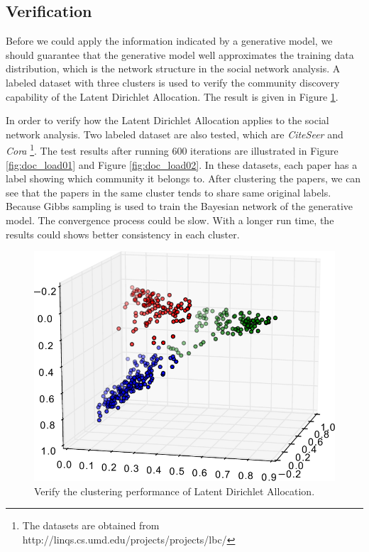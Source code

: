 \documentclass[letterpaper]{article}
\begin{document}
\subsection{Verification}

Before we could apply the information indicated by a generative model, we should guarantee that the generative model well approximates the training data distribution, which is the network structure in the social network analysis.
A labeled dataset with three clusters is used to verify the community discovery capability of the Latent Dirichlet Allocation.
The result is given in Figure \ref{fig:cluster3}.

In order to verify how the Latent Dirichlet Allocation applies to the social network analysis.
Two labeled dataset are also tested, which are \emph{CiteSeer} and \emph{Cora}
\footnote{The datasets are obtained from http://linqs.cs.umd.edu/projects/projects/lbc/}.
The test results after running 600 iterations are illustrated in Figure \ref{fig:doc_load01} and Figure \ref{fig:doc_load02}.
In these datasets, each paper has a label showing which community it belongs to.
After clustering the papers, we can see that the papers in the same cluster tends to share same original labels.
Because Gibbs sampling is used to train the Bayesian network of the generative model.
The convergence process could be slow.
With a longer run time, the results could shows better consistency in each cluster.

\begin{figure}[ht]
\centering
\includegraphics[width=0.8\linewidth]{./fig/cluster3}
\caption{Verify the clustering performance of Latent Dirichlet Allocation.}
\label{fig:cluster3}
\end{figure}
\end{document}
